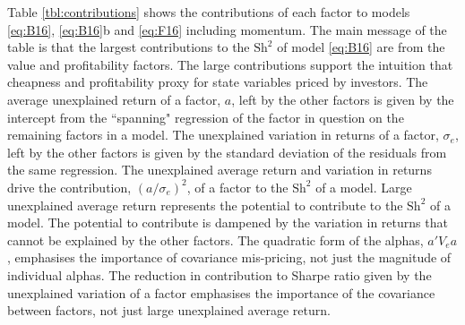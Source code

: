 

Table \ref{tbl:contributions} shows the contributions of each factor to models
\ref{eq:B16}, \ref{eq:B16}b and \ref{eq:F16} including momentum.
The main message of the table is that the largest contributions to the
$\text{Sh}^2$ of model \ref{eq:B16} are from the value and profitability
factors. The large contributions support the intuition that
cheapness and profitability proxy for state variables priced by investors.
The average unexplained return of a factor, $a$, left by the other factors is
given by the 
intercept from the ``spanning" regression of the factor in
question on the remaining
factors in a model.
The unexplained variation in returns of a factor, $\sigma_e$, left by the other
factors is given by the standard deviation of the residuals from the same
regression.
The unexplained average return and variation in returns drive the contribution,
$(a/\sigma_e)^2$, of a factor to the $\text{Sh}^2$ of a model.
Large unexplained average return represents the potential to contribute
to the $\text{Sh}^2$ of a model.
The potential to contribute is dampened by the variation in returns that cannot
be explained by the other factors.
The quadratic form of the alphas, $a'V_ea$, emphasises the importance
of covariance mis-pricing, not just the magnitude of individual alphas.
The reduction in contribution to Sharpe ratio given by the unexplained
variation of a factor emphasises the importance of the covariance between
factors, not just large unexplained average return.


